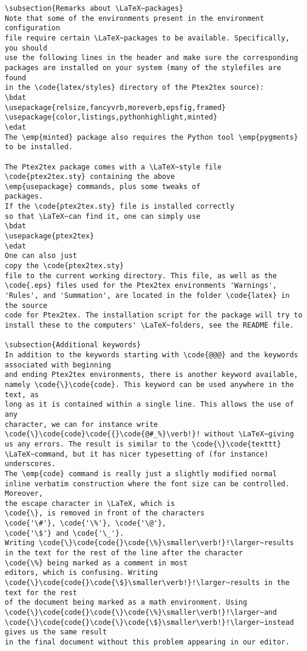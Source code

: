 \documentclass[a4paper,11pt]{article}
\begin{document}
{{{{{{{{{{{\begin{Verbatim}
\subsection{Remarks about \LaTeX~packages}
Note that some of the environments present in the environment configuration
file require certain \LaTeX~packages to be available. Specifically, you should
use the following lines in the header and make sure the corresponding
packages are installed on your system (many of the stylefiles are found
in the \code{latex/styles} directory of the Ptex2tex source):
\bdat
\usepackage{relsize,fancyvrb,moreverb,epsfig,framed}
\usepackage{color,listings,pythonhighlight,minted}
\edat
The \emp{minted} package also requires the Python tool \emp{pygments}
to be installed.

The Ptex2tex package comes with a \LaTeX~style file
\code{ptex2tex.sty} containing the above 
\emp{usepackage} commands, plus some tweaks of
packages.
If the \code{ptex2tex.sty} file is installed correctly
so that \LaTeX~can find it, one can simply use
\bdat
\usepackage{ptex2tex}
\edat
One can also just
copy the \code{ptex2tex.sty} 
file to the current working directory. This file, as well as the
\code{.eps} files used for the Ptex2tex environments 'Warnings',
'Rules', and 'Summation', are located in the folder \code{latex} in the source
code for Ptex2tex. The installation script for the package will try to
install these to the computers' \LaTeX~folders, see the README file.

\subsection{Additional keywords}
In addition to the keywords starting with \code{@@@} and the keywords
associated with beginning
and ending Ptex2tex environments, there is another keyword available,
namely \code{\}\code{code}. This keyword can be used anywhere in the text, as
long as it is contained within a single line. This allows the use of any
character, we can for instance write 
\code{\}\code{code}\code{{}\code{@#_%}\verb!}! without \LaTeX~giving
us any errors. The result is similar to the \code{\}\code{texttt}
\LaTeX~command, but it has nicer typesetting of (for instance) underscores.
The \emp{code} command is really just a slightly modified normal 
inline verbatim construction where the font size can be controlled. 
Moreover,
the escape character in \LaTeX, which is
\code{\}, is removed in front of the characters 
\code{'\#'}, \code{'\%'}, \code{'\@'},
\code{'\$'} and \code{'\_'}. 
Writing \code{\}\code{code{}\code{\%}\smaller\verb!}!\larger~results
in the text for the rest of the line after the character 
\code{\%} being marked as a comment in most
editors, which is confusing. Writing
\code{\}\code{code{}\code{\$}\smaller\verb!}!\larger~results in the text for the rest
of the document being marked as a math environment. Using
\code{\}\code{code{}\code{\}\code{\%}\smaller\verb!}!\larger~and
\code{\}\code{code{}\code{\}\code{\$}\smaller\verb!}!\larger~instead gives us the same result
in the final document without this problem appearing in our editor.


\end{Verbatim}}}}}}}}}}}}
\end{document}
